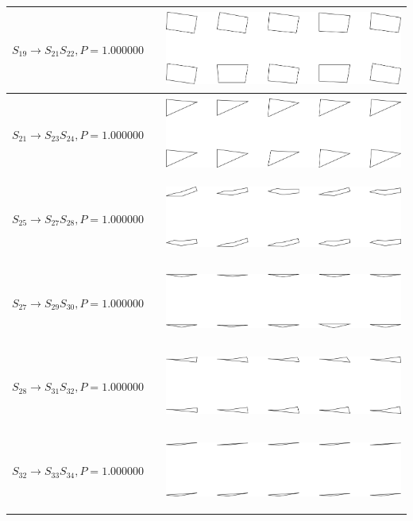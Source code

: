 \begin{tabular}{|l|c|c|}

\hline
$S_{19} \to S_{21} S_{22}, P=1.000000$ &  & \includegraphics[height=1in]{output/1.models/hand_built/romerchoice/gram.0012.sample.png} \\
\hline
$S_{21} \to S_{23} S_{24}, P=1.000000$ &  & \includegraphics[height=1in]{output/1.models/hand_built/romerchoice/gram.0013.sample.png} \\
\hline
$S_{25} \to S_{27} S_{28}, P=1.000000$ &  & \includegraphics[height=1in]{output/1.models/hand_built/romerchoice/gram.0014.sample.png} \\
\hline
$S_{27} \to S_{29} S_{30}, P=1.000000$ &  & \includegraphics[height=1in]{output/1.models/hand_built/romerchoice/gram.0015.sample.png} \\
\hline
$S_{28} \to S_{31} S_{32}, P=1.000000$ &  & \includegraphics[height=1in]{output/1.models/hand_built/romerchoice/gram.0016.sample.png} \\
\hline
$S_{32} \to S_{33} S_{34}, P=1.000000$ &  & \includegraphics[height=1in]{output/1.models/hand_built/romerchoice/gram.0017.sample.png} \\
\hline
\end{tabular}

